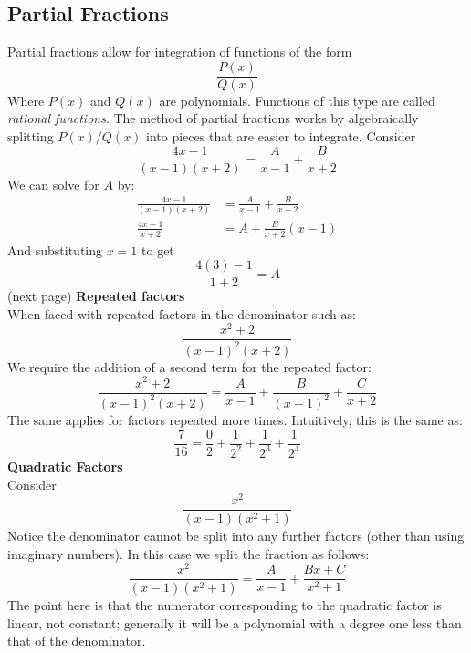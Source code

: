 \documentclass{report}
\begin{document}
\subsection{Partial Fractions}
Partial fractions allow for integration of functions of the form
\begin{equation*}
\frac{P(x)}{Q(x)}
\end{equation*}
Where $P(x)$ and $Q(x)$ are polynomials. Functions of this type are called \textit{rational functions}.
The method of partial fractions works by algebraically splitting $P(x)/Q(x)$ into pieces that
are easier to integrate. Consider
\begin{equation*}
\frac{4x-1}{(x-1)(x+2)}=\frac{A}{x-1}+\frac{B}{x+2}
\end{equation*}
We can solve for $A$ by:
\begin{align*}
\frac{4x-1}{(x-1)(x+2)}&=\frac{A}{x-1}+\frac{B}{x+2}\\
\frac{4x-1}{x+2}&=A+\frac{B}{x+2}(x-1)
\end{align*}
And substituting $x=1$ to get
\begin{equation*}
\frac{4(3)-1}{1+2}=A
\end{equation*}
(next page)
\newpage
\noindent\textbf{Repeated factors}\\
When faced with repeated factors in the denominator such as:
\begin{equation*}
\frac{x^2+2}{(x-1)^2(x+2)}
\end{equation*}
We require the addition of a second term for the repeated factor:
\begin{equation*}
\frac{x^2+2}{(x-1)^2(x+2)}=\frac{A}{x-1}+\frac{B}{(x-1)^2}+\frac{C}{x+2}
\end{equation*}
The same applies for factors repeated more times. Intuitively, this is the same as:
\begin{equation*}
\frac{7}{16}=\frac{0}{2}+\frac{1}{2^2}+\frac{1}{2^3}+\frac{1}{2^4}
\end{equation*}
\textbf{Quadratic Factors}\\
Consider
\begin{equation*}
\frac{x^2}{(x-1)(x^2+1)}
\end{equation*}
Notice the denominator cannot be split into any further factors
(other than using imaginary numbers). In this case we split the
fraction as follows:
\begin{equation*}
\frac{x^2}{(x-1)(x^2+1)}=\frac{A}{x-1}+\frac{Bx+C}{x^2+1}
\end{equation*}
The point here is that the numerator corresponding to the quadratic factor is linear, not
constant; generally it will be a polynomial with a degree one less than that of the denominator.
\newpage
\end{document}
